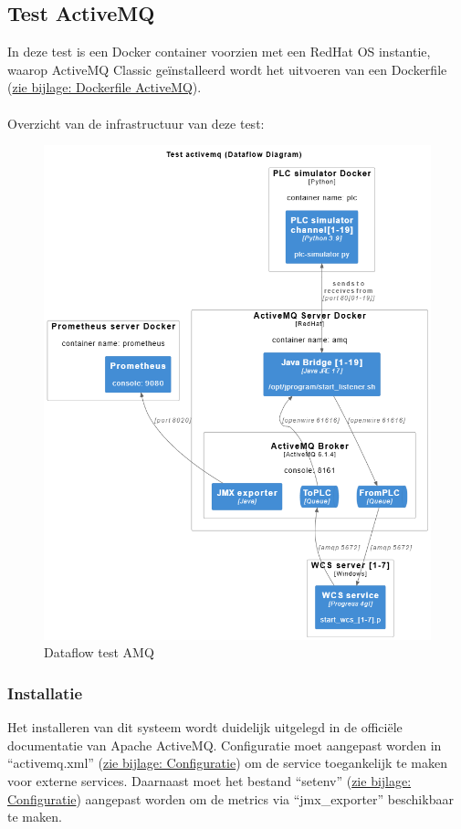 \subsection{Test ActiveMQ}
In deze test is een Docker container voorzien met een RedHat OS instantie, waarop ActiveMQ Classic 
geïnstalleerd wordt het uitvoeren van een Dockerfile (\hyperref[listing:docker_amq]{zie bijlage: Dockerfile ActiveMQ}).
\\\\
Overzicht van de infrastructuur van deze test:
\begin{figure}[!h]
  \centering
  \includegraphics[width=.80\textwidth]{img/test_amq_dataflow.png}
  \caption{\label{fig:test_amq_dataflow}Dataflow test AMQ}
\end{figure}

\subsubsection{Installatie}
Het installeren van dit systeem wordt duidelijk uitgelegd in de officiële documentatie van Apache ActiveMQ.
Configuratie moet aangepast worden in ``activemq.xml'' (\hyperref[listing:configxml_activemq]{zie bijlage: Configuratie}) om de service toegankelijk te maken voor externe services.
Daarnaast moet het bestand ``setenv'' (\hyperref[listing:configxml_activemq]{zie bijlage: Configuratie}) aangepast worden om de metrics via ``jmx\_exporter'' beschikbaar te maken.

